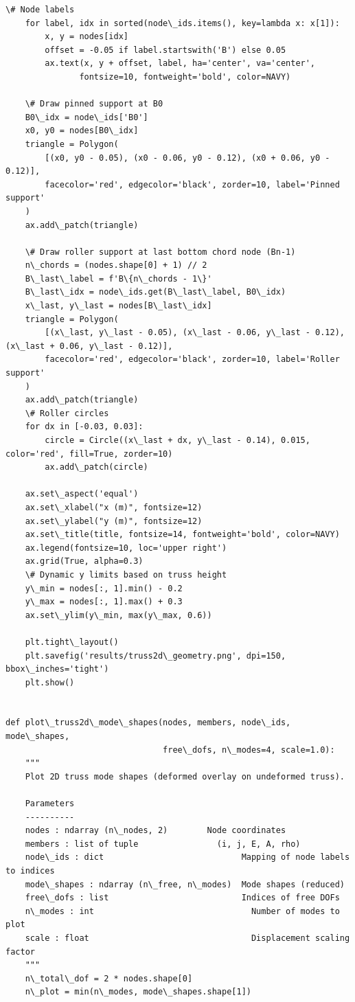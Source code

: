 \documentclass[12pt, a4paper]{article}
\begin{document}
\begin{lstlisting}[style=codestyle, caption={{visualize_truss2d.py --- 2D Warren Truss Visualizations}}]
    \# Node labels
    for label, idx in sorted(node\_ids.items(), key=lambda x: x[1]):
        x, y = nodes[idx]
        offset = -0.05 if label.startswith('B') else 0.05
        ax.text(x, y + offset, label, ha='center', va='center',
               fontsize=10, fontweight='bold', color=NAVY)

    \# Draw pinned support at B0
    B0\_idx = node\_ids['B0']
    x0, y0 = nodes[B0\_idx]
    triangle = Polygon(
        [(x0, y0 - 0.05), (x0 - 0.06, y0 - 0.12), (x0 + 0.06, y0 - 0.12)],
        facecolor='red', edgecolor='black', zorder=10, label='Pinned support'
    )
    ax.add\_patch(triangle)

    \# Draw roller support at last bottom chord node (Bn-1)
    n\_chords = (nodes.shape[0] + 1) // 2
    B\_last\_label = f'B\{n\_chords - 1\}'
    B\_last\_idx = node\_ids.get(B\_last\_label, B0\_idx)
    x\_last, y\_last = nodes[B\_last\_idx]
    triangle = Polygon(
        [(x\_last, y\_last - 0.05), (x\_last - 0.06, y\_last - 0.12), (x\_last + 0.06, y\_last - 0.12)],
        facecolor='red', edgecolor='black', zorder=10, label='Roller support'
    )
    ax.add\_patch(triangle)
    \# Roller circles
    for dx in [-0.03, 0.03]:
        circle = Circle((x\_last + dx, y\_last - 0.14), 0.015, color='red', fill=True, zorder=10)
        ax.add\_patch(circle)

    ax.set\_aspect('equal')
    ax.set\_xlabel("x (m)", fontsize=12)
    ax.set\_ylabel("y (m)", fontsize=12)
    ax.set\_title(title, fontsize=14, fontweight='bold', color=NAVY)
    ax.legend(fontsize=10, loc='upper right')
    ax.grid(True, alpha=0.3)
    \# Dynamic y limits based on truss height
    y\_min = nodes[:, 1].min() - 0.2
    y\_max = nodes[:, 1].max() + 0.3
    ax.set\_ylim(y\_min, max(y\_max, 0.6))

    plt.tight\_layout()
    plt.savefig('results/truss2d\_geometry.png', dpi=150, bbox\_inches='tight')
    plt.show()


def plot\_truss2d\_mode\_shapes(nodes, members, node\_ids, mode\_shapes,
                                free\_dofs, n\_modes=4, scale=1.0):
    """
    Plot 2D truss mode shapes (deformed overlay on undeformed truss).

    Parameters
    ----------
    nodes : ndarray (n\_nodes, 2)        Node coordinates
    members : list of tuple                (i, j, E, A, rho)
    node\_ids : dict                            Mapping of node labels to indices
    mode\_shapes : ndarray (n\_free, n\_modes)  Mode shapes (reduced)
    free\_dofs : list                           Indices of free DOFs
    n\_modes : int                                Number of modes to plot
    scale : float                                 Displacement scaling factor
    """
    n\_total\_dof = 2 * nodes.shape[0]
    n\_plot = min(n\_modes, mode\_shapes.shape[1])


\end{lstlisting}
\end{document}
